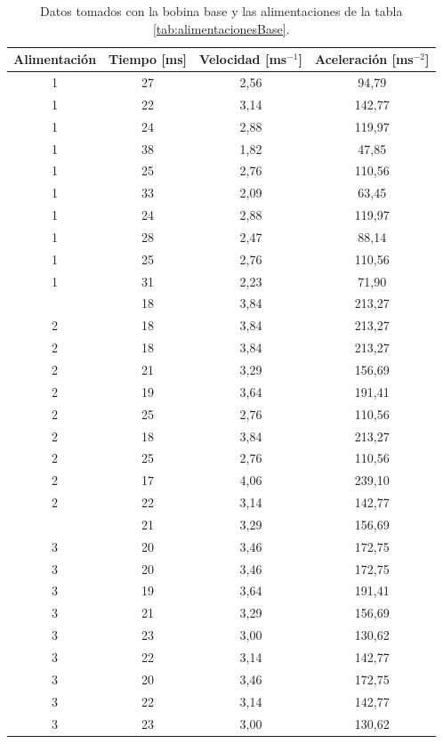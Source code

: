 \begin{table}[H]
    \centering
    \setlength{\tabcolsep}{5pt}
    \renewcommand{\arraystretch}{1.2}
    \begin{tabular}{|c|c|c|c|}
        \hline
        \textbf{Alimentación} & \textbf{Tiempo [ms]} & \textbf{Velocidad [ms\(^{-1}\)]} & \textbf{Aceleración [ms\(^{-2}\)]} \\
        \hline
        1 & 27 & 2,56 & 94,79 \\
        1 & 22 & 3,14 & 142,77 \\
        1 & 24 & 2,88 & 119,97 \\
        1 & 38 & 1,82 & 47,85 \\
        1 & 25 & 2,76 & 110,56 \\
        1 & 33 & 2,09 & 63,45 \\
        1 & 24 & 2,88 & 119,97 \\
        1 & 28 & 2,47 & 88,14 \\
        1 & 25 & 2,76 & 110,56 \\
        1 & 31 & 2,23 & 71,90 \\
        \hdashline[2pt/5pt]
        2 & 18 & 3,84 & 213,27 \\
        2 & 18 & 3,84 & 213,27 \\
        2 & 18 & 3,84 & 213,27 \\
        2 & 21 & 3,29 & 156,69 \\
        2 & 19 & 3,64 & 191,41 \\
        2 & 25 & 2,76 & 110,56 \\
        2 & 18 & 3,84 & 213,27 \\
        2 & 25 & 2,76 & 110,56 \\
        2 & 17 & 4,06 & 239,10 \\
        2 & 22 & 3,14 & 142,77 \\
        \hdashline[2pt/5pt]
        3 & 21 & 3,29 & 156,69 \\
        3 & 20 & 3,46 & 172,75 \\
        3 & 20 & 3,46 & 172,75 \\
        3 & 19 & 3,64 & 191,41 \\
        3 & 21 & 3,29 & 156,69 \\
        3 & 23 & 3,00 & 130,62 \\
        3 & 22 & 3,14 & 142,77 \\
        3 & 20 & 3,46 & 172,75 \\
        3 & 22 & 3,14 & 142,77 \\
        3 & 23 & 3,00 & 130,62 \\
        \hline
    \end{tabular}
    \caption{Datos tomados con la bobina base y las alimentaciones de la tabla \ref{tab:alimentacionesBase}.}
    \label{tab:datosBase}
\end{table}
